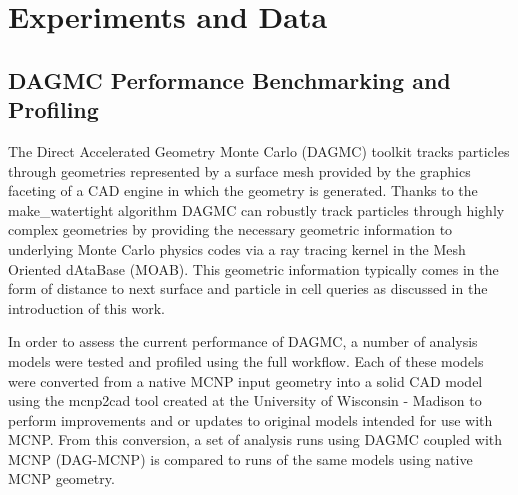 \documentclass[12pt, a4paper]{article}
\begin{document}

\newpage

\section{Experiments and Data}%
\label{experiments_and_data}

\subsection{DAGMC Performance Benchmarking and Profiling}%
\label{perf_benchmark}

The Direct Accelerated Geometry Monte Carlo (DAGMC) toolkit tracks particles through geometries represented by a surface mesh provided by the graphics faceting of a CAD engine in which the geometry is generated\cite{Tautges_2009}. Thanks to the make\_watertight algorithm\cite{Smith_2010} DAGMC can robustly track particles through highly complex geometries by providing the necessary geometric information to underlying Monte Carlo physics codes via a ray tracing kernel in the Mesh Oriented dAtaBase (MOAB)\cite{Tautges_2004}. This geometric information typically comes in the form of distance to next surface and particle in cell queries as discussed in the introduction of this work.

In order to assess the current performance of DAGMC, a number of analysis models were tested and profiled using the full workflow. Each of these models were converted from a native MCNP input geometry into a solid CAD model using the mcnp2cad tool created at the University of Wisconsin - Madison to perform improvements and or updates to original models intended for use with MCNP. From this conversion, a set of analysis runs using DAGMC coupled with MCNP (DAG-MCNP) is compared to runs of the same models using native MCNP geometry.
\end{document}
